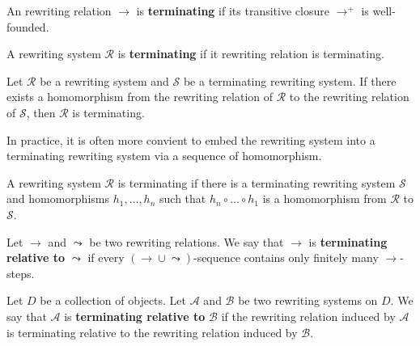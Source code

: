 \begin{definition}
    \label{def:rewriting_relation:termination}
An rewriting relation $\to$ is \textbf{terminating} if its transitive closure $\to^+$ is well-founded.
\end{definition}

\begin{definition}
    \label{def:rewriting_system:termination}
    A rewriting system $\mathcal{R}$
     is \textbf{terminating} if it rewriting relation
      is terminating.
\end{definition}

\begin{proposition}
    Let $\mathcal{R}$ be a rewriting system and $\mathcal{S}$ be a terminating rewriting system.
    If there exists a homomorphism from the rewriting relation of $\mathcal{R}$ to the rewriting relation of $\mathcal{S}$, then $\mathcal{R}$ is terminating.  
\end{proposition}

In practice, it is often more convient to embed the rewriting system into a terminating rewriting system via a sequence of homomorphism.
\begin{corollary}
  A rewriting system $\mathcal{R}$ is terminating if there is a terminating rewriting system $\mathcal{S}$ and homomorphisms $h_1,\ldots, h_n$ such that $h_n \circ \ldots \circ h_1$ is a homomorphism from $\mathcal{R}$ to $\mathcal{S}$.
\end{corollary}

\begin{definition}
    \label{def:rewriting_relation:relative_termination}
    Let \( \mathop{\to} \) and \( \leadsto \) be two rewriting relations. We say that \(\to\) is \textbf{terminating relative to} \(\leadsto\) if every \( \left( \mathop{\to} \mathop{\cup} \leadsto \right) \)-sequence contains only finitely many \(\to\)-steps.
\end{definition}

\begin{definition}
    \label{def:rewriting_system:relative_termination}
    Let $D$ be a collection of objects.
    Let \( \mathcal{A} \) and \( \mathcal{B} \) be two rewriting systems on $D$. We say that \(\mathcal{A}\) is \textbf{terminating relative to} \(\mathcal{B}\) if the rewriting relation induced by \(\mathcal{A}\) is terminating relative to the rewriting relation induced by \(\mathcal{B}\).
\end{definition}

